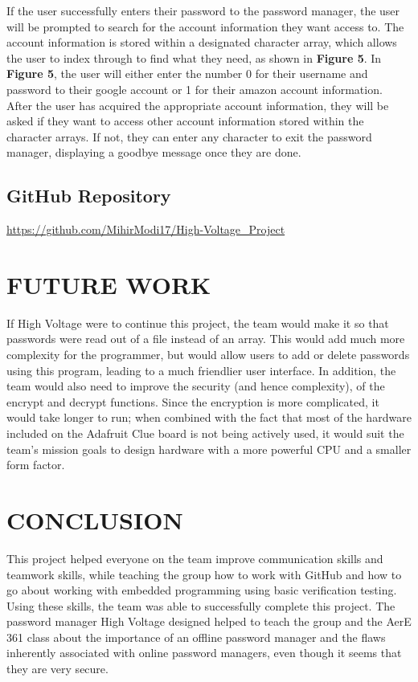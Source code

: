 \documentclass[12pt]{article}
\begin{document}
\hspace{1cm}If the user successfully enters their password to the password manager, the user will be prompted to search for the account information they want access to. The account information is stored within a designated character array, which allows the user to index through to find what they need, as shown in \textbf{Figure 5}. In \textbf{Figure 5}, the user will either enter the number 0 for their username and password to their google account or 1 for their amazon account information. After the user has acquired the appropriate account information, they will be asked if they want to access other account information stored within the character arrays. If not, they can enter any character to exit the password manager, displaying a goodbye message once they are done. 

\subsection{GitHub Repository}
\url{https://github.com/MihirModi17/High-Voltage_Project}

\section{FUTURE WORK}

\hspace{1cm}If High Voltage were to continue this project, the team would make it so that passwords were read out of a file instead of an array. This would add much more complexity for the programmer, but would allow users to add or delete passwords using this program, leading to a much friendlier user interface. In addition, the team would also need to improve the security (and hence complexity), of the encrypt and decrypt functions. Since the encryption is more complicated, it would take longer to run; when combined with the fact that most of the hardware included on the Adafruit Clue board is not being actively used, it would suit the team's mission goals to design hardware with a more powerful CPU and a smaller form factor.

\section{CONCLUSION}

This project helped everyone on the team improve communication skills and teamwork skills, while teaching the group how to work with GitHub and how to go about working with embedded programming using basic verification testing. Using these skills, the team was able to successfully complete this project. The password manager High Voltage designed helped to teach the group and the AerE 361 class about the importance of an offline password manager and the flaws inherently associated with online password managers, even though it seems that they are very secure. 
\end{document}
